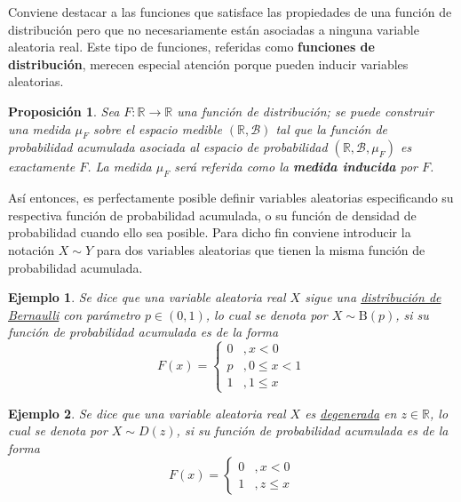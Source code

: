 \documentclass[12pt,letterpaper]{book}
\newtheorem{proposicion}[teorema]{Proposición}
\newtheorem{ejemplo}{Ejemplo}[chapter]
\newcommand{\R}{\mathbb{R}}
\begin{document}
Conviene destacar a las funciones que satisface las propiedades de una función de distribución pero que no necesariamente están asociadas a ninguna variable aleatoria real.
%
Este tipo de funciones, referidas como \textbf{funciones de distribución}, merecen especial atención porque pueden inducir variables aleatorias.

\begin{proposicion}
Sea $F:\R \rightarrow \R$ una función de distribución; se puede construir una medida $\mu_F$ sobre el espacio medible $(\R, \mathcal{B})$ tal que la función de probabilidad acumulada asociada al espacio de probabilidad $(\R, \mathcal{B}, \mu_F)$ es exactamente $F$.
%
La medida $\mu_F$ será referida como la \textbf{medida inducida} por $F$.
\end{proposicion}

Así entonces, es perfectamente posible definir variables aleatorias especificando su respectiva función de probabilidad acumulada, o su función de densidad de probabilidad cuando ello sea posible.
%
Para dicho fin conviene introducir la notación $X \sim Y$ para dos variables aleatorias que tienen la misma función de probabilidad acumulada.

\begin{ejemplo}
Se dice que una variable aleatoria real $X$ sigue una \ul{distribuci\'on de Bernaulli} con parámetro $p\in (0,1)$, lo cual se denota por $X\sim \text{B}(p)$, si su función de probabilidad acumulada es de la forma
\begin{equation}
F(x) = \begin{cases}
0 &, x < 0 \\
p &, 0 \leq x < 1 \\
1 &, 1 \leq x
\end{cases}
\end{equation}
\end{ejemplo}

\begin{ejemplo}
Se dice que una variable aleatoria real $X$ es \ul{degenerada} en $z\in \R$, lo cual se denota por $X\sim D(z)$, si su función de probabilidad acumulada es de la forma
\begin{equation}
F(x) = \begin{cases}
0 &, x < 0 \\
1 &, z \leq x
\end{cases}
\end{equation}
\end{ejemplo}
\end{document}
